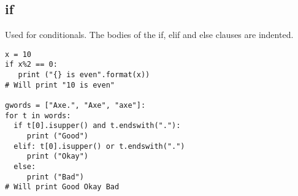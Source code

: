 \subsection{if}
Used for conditionals. The bodies of the if, elif and else clauses are indented.

\begin{lstlisting}
x = 10
if x%2 == 0:
   print ("{} is even".format(x))
# Will print "10 is even"

gwords = ["Axe.", "Axe", "axe"]:
for t in words:
  if t[0].isupper() and t.endswith("."):
     print ("Good")
  elif: t[0].isupper() or t.endswith(".")
     print ("Okay")  
  else:
     print ("Bad")
# Will print Good Okay Bad
\end{lstlisting}


